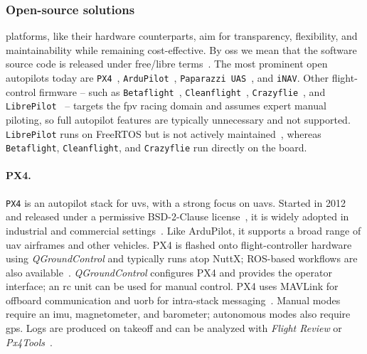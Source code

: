\subsubsection{Open-source solutions}%
\label{sec:open-source-solut-sw}

 platforms, like their hardware counterparts, aim for transparency, flexibility, and maintainability while remaining cost-effective. 
By \gls{oss} we mean that the software source code is released under free/libre terms~\cite{freeGNU}. 
The most prominent open autopilots today are \lstinline|PX4|~\cite{px4-github}, \lstinline|ArduPilot|~\cite{arduPilot-github}, \lstinline|Paparazzi UAS|~\cite{paparazzi-github}, and \lstinline|iNAV|. 
Other flight-control firmware -- such as
\lstinline|Betaflight|~\cite{betaflight-github},
\lstinline|Cleanflight|~\cite{cleanflight-github},
\lstinline|Crazyflie|~\cite{crazyflie-home}, and
\lstinline|LibrePilot|~\cite{librePilot-arch} -- targets the \gls{fpv} racing domain and assumes expert manual piloting, so full autopilot features are typically unnecessary and not supported. 
\lstinline|LibrePilot| runs on FreeRTOS but is not actively maintained~\cite{librePilot-github}, whereas \lstinline|Betaflight|, \lstinline|Cleanflight|, and \lstinline|Crazyflie| run directly on the board.

\paragraph{PX4.}
\lstinline|PX4| is an autopilot stack for \glspl{uv}, with a strong focus on \glspl{uav}. 
Started in 2012 and released under a permissive BSD-2-Clause license~\cite{px4-github}, it is widely adopted in industrial and commercial settings~\cite{skynodeX-px4,spRacing-px4}. 
Like ArduPilot, it supports a broad range of \gls{uav} airframes and other vehicles. 
PX4 is flashed onto flight-controller hardware using \emph{QGroundControl} and typically runs atop NuttX; ROS-based workflows are also available~\cite{jargalsaikhan2022architectural}. 
\emph{QGroundControl} configures PX4 and provides the operator interface; an \gls{rc} unit can be used for manual control. 
PX4 uses MAVLink for offboard communication and \gls{uorb} for intra-stack messaging~\cite{px4-sysArch,jargalsaikhan2022architectural}. 
Manual modes require an \gls{imu}, magnetometer, and barometer; autonomous modes also require \gls{gps}. 
Logs are produced on takeoff and can be analyzed with \emph{Flight Review} or \emph{Px4Tools}~\cite{glossner2021overview}.

